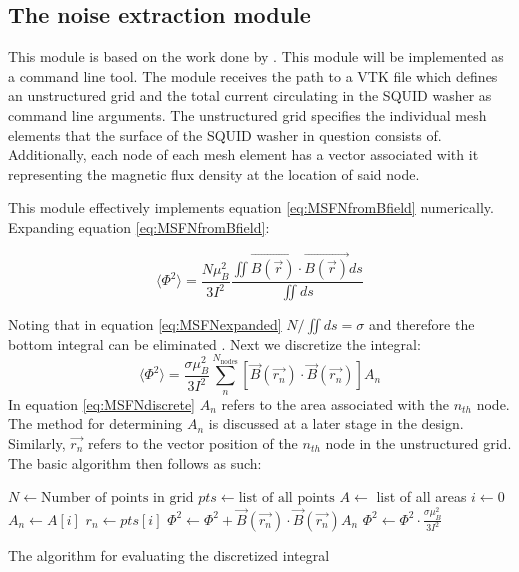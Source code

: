 \subsection{The noise extraction module}
\label{chap:nex}
This module is based on the work done by \cite{fluxNoiseSquidsStevenAnton}. This module will be implemented as a command line tool. The module receives the path to a VTK file which defines an unstructured grid and the total current circulating in the SQUID washer as command line arguments. The unstructured grid specifies the individual mesh elements that the surface of the SQUID washer in question consists of. Additionally, each node of each mesh element has a vector associated with it representing the magnetic flux density at the location of said node. \par
This module effectively implements equation \ref{eq:MSFNfromBfield} numerically. Expanding equation \ref{eq:MSFNfromBfield}:


\begin{equation}
    \langle \Phi ^2 \rangle = \frac{N\mu_B^2}{3I^2} \frac{\iint \Vec{B(\Vec{r})}\cdot\Vec{B(\Vec{r})} ds}{\iint ds}
    \label{eq:MSFNexpanded}
\end{equation}

Noting that in equation \ref{eq:MSFNexpanded} $N/\iint ds = \sigma$ and therefore the bottom integral can be eliminated \cite{fluxNoiseSquidsStevenAnton}. Next we discretize the integral: 
\begin{equation}
    \langle \Phi ^2 \rangle = \frac{\sigma\mu_B^2}{3I^2}\sum_{n}^{N_{\text{nodes}}}[\Vec{B}(\Vec{r_n})\cdot\Vec{B}(\Vec{r_n})]A_n
    \label{eq:MSFNdiscrete}
\end{equation}
In equation \ref{eq:MSFNdiscrete} $A_n$ refers to the area associated with the $n_{th}$ node. The method for determining $A_n$ is discussed at a later stage in the design. Similarly, $\Vec{r_n}$ refers to the vector position of the $n_{th}$ node in the unstructured grid. The basic algorithm then follows as such:
\begin{algorithm}
\begin{algorithmic}
    \State $N \gets \text{Number of points in grid}$
    \State $pts \gets \text{list of all points}$
    \State $A \gets $ list of all areas
    \State $i \gets 0$ 
        \State $A_n \gets A[i]$
        \State $r_n \gets pts[i]$ 
        \State $\Phi^2 \gets \Phi^2 + \Vec{B}(\Vec{r_n})\cdot \Vec{B}(\Vec{r_n}) A_n$ 
    \EndWhile
    \State $\Phi^2 \gets \Phi^2 \cdot \frac{\sigma\mu_B^2}{3I^2}$ 
\end{algorithmic}
\caption{The algorithm for evaluating the discretized integral}
\end{algorithm}

